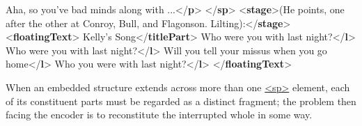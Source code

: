 \begin{shaded}
Aha, so you've bad minds along with ...{</\textbf{p}>}\mbox{}\newline 
{</\textbf{sp}>}\mbox{}\newline 
{<\textbf{stage}>}(He points, one after the other at Conroy, Bull,\mbox{}\newline 
 and Flagonson. Lilting):{</\textbf{stage}>}\mbox{}\newline 
{<\textbf{floatingText}>}\mbox{}\newline 
{}\mbox{}\newline 
\hspace*{1em}Kelly's Song{</\textbf{titlePart}>}\mbox{}\newline 
{}\mbox{}\newline 
{}\mbox{}\newline 
\hspace*{1em}Who were you with last night?{</\textbf{l}>}\mbox{}\newline 
\hspace*{1em}Who were you with last night?{</\textbf{l}>}\mbox{}\newline 
\hspace*{1em}Will you tell your missus when you go home{</\textbf{l}>}\mbox{}\newline 
\hspace*{1em}Who you were with last night?{</\textbf{l}>}\mbox{}\newline 
{}\mbox{}\newline 
{</\textbf{floatingText}>}\end{shaded}\egroup\par \par
When an embedded structure extends across more than one \hyperref[TEI.sp]{<sp>} element, each of its constituent parts must be regarded as a distinct fragment; the problem then facing the encoder is to reconstitute the interrupted whole in some way.\par
